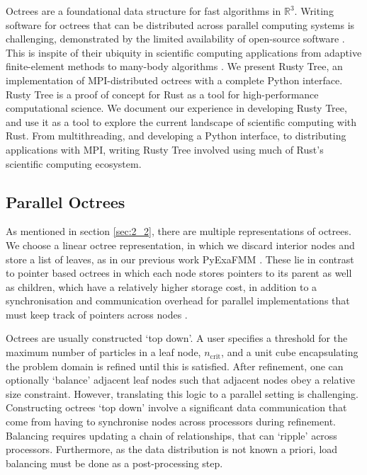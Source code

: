Octrees are a foundational data structure for fast algorithms in $\mathbb{R}^3$. Writing software for octrees that can be distributed across parallel computing systems is challenging, demonstrated by the limited availability of open-source software \cite{BursteddeWilcoxGhattas11,fernando2020github}. This is inspite of their ubiquity in scientific computing applications from adaptive finite-element methods to many-body algorithms \cite{sundar2008bottom}. We present Rusty Tree, an implementation of MPI-distributed octrees with a complete Python interface. Rusty Tree is a proof of concept for Rust as a tool for high-performance computational science. We document our experience in developing Rusty Tree, and use it as a tool to explore the current landscape of scientific computing with Rust. From multithreading, and developing a Python interface, to distributing applications with MPI, writing Rusty Tree involved using much of Rust's scientific computing ecosystem. 

\subsection*{Parallel Octrees}

As mentioned in section \ref{sec:2_2}, there are multiple representations of octrees. We choose a linear octree representation, in which we discard interior nodes and store a list of leaves, as in our previous work PyExaFMM \cite{kailasa2022pyexafmm}. These lie in contrast to pointer based octrees in which each node stores pointers to its parent as well as children, which have a relatively higher storage cost, in addition to a synchronisation and communication overhead for parallel implementations that must keep track of pointers across nodes \cite{tu2005scalable}. 

Octrees are usually constructed `top down'. A user specifies a threshold for the maximum number of particles in a leaf node, $n_{\text{crit}}$, and a unit cube encapsulating the problem domain is refined until this is satisfied. After refinement, one can optionally `balance' adjacent leaf nodes such that adjacent nodes obey a relative size constraint. However, translating this logic to a parallel setting is challenging. Constructing octrees `top down' involve a significant data communication that come from having to synchronise nodes across processors during refinement. Balancing requires updating a chain of relationships, that can `ripple' across processors. Furthermore, as the data distribution is not known a priori, load balancing must be done as a post-processing step.

